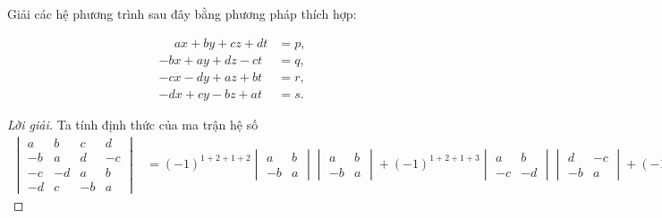 \documentclass[class=nhvh-linear-algebra,crop=false]{standalone}
\begin{document}
\par Giải các hệ phương trình sau đây bằng phương pháp thích hợp:

\begin{exercise}
    \begin{align*}
        \phantom{-}ax + by + cz + dt & = p, \\
        -bx + ay + dz - ct           & = q, \\
        -cx - dy + az + bt           & = r, \\
        -dx + cy - bz + at           & = s.
    \end{align*}
\end{exercise}

\begin{proof}[Lời giải]
    \par Ta tính định thức của ma trận hệ số
    \begingroup{}
    \allowdisplaybreaks{}
    \begin{align*}
        \begin{vmatrix}
            a  & b  & c  & d  \\
            -b & a  & d  & -c \\
            -c & -d & a  & b  \\
            -d & c  & -b & a
        \end{vmatrix}
         & = {(-1)}^{1+2+1+2}
        \begin{vmatrix}
            a  & b \\
            -b & a
        \end{vmatrix}
        \begin{vmatrix}
            a  & b \\
            -b & a
        \end{vmatrix}
        + {(-1)}^{1+2+1+3}
        \begin{vmatrix}
            a  & b  \\
            -c & -d
        \end{vmatrix}
        \begin{vmatrix}
            d  & -c \\
            -b & a
        \end{vmatrix}
        + {(-1)}^{1+2+1+4}
        \begin{vmatrix}
            a  & b \\
            -d & c
        \end{vmatrix}
        \begin{vmatrix}
            d & -c \\

\end{vmatrix}
\end{align*}
\end{proof}
\end{document}
